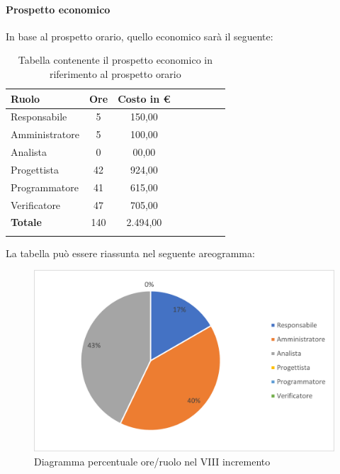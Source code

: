 \paragraph{Prospetto economico}
In base al prospetto orario, quello economico sarà il seguente:

\begin{longtable}{|l|c|c|c|c|c|c|c|}
	\hline
	\rowcolor{lighter-grayer}
	\textbf{Ruolo}  & \textbf{Ore} & \textbf{Costo in €} \\
	\hline
	\endfirsthead

	\hline
	Responsabile    & 5            & 150,00              \\
	\hline
	\hline
	Amministratore  & 5           & 100,00              \\
	\hline
	\hline
	Analista        & 0           & 00,00              \\
	\hline
	\hline
	Progettista     & 42            & 924,00                   \\
	\hline
	\hline
	Programmatore   & 41            & 615,00                   \\
	\hline
	\hline
	Verificatore    & 47            & 705,00                   \\
	\hline
	\textbf{Totale} & 140           & 2.494,00            \\
	\hline
	\rowcolor{white}
	\caption{Tabella contenente il prospetto economico in riferimento al prospetto orario}
\end{longtable}
\pagebreak

La tabella può essere riassunta nel seguente areogramma:
\begin{figure}[H]
	\centering
	\includegraphics[width=0.8\linewidth]{res/images/preventivo/dettaglio_analisi/1-2.png}
	\caption{Diagramma percentuale ore/ruolo nel VIII incremento}
	\label{fig:diagramma costi ruolo  VIII incremento}
\end{figure}

